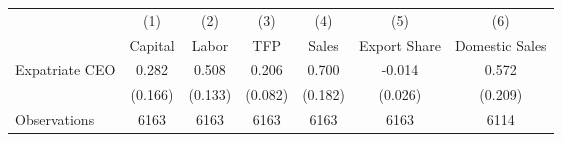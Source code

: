 \begin{tabular}{l*{6}{c}}
\hline\hline
                    &\multicolumn{1}{c}{(1)}&\multicolumn{1}{c}{(2)}&\multicolumn{1}{c}{(3)}&\multicolumn{1}{c}{(4)}&\multicolumn{1}{c}{(5)}&\multicolumn{1}{c}{(6)}\\
                    &\multicolumn{1}{c}{Capital}&\multicolumn{1}{c}{Labor}&\multicolumn{1}{c}{TFP}&\multicolumn{1}{c}{Sales}&\multicolumn{1}{c}{Export Share}&\multicolumn{1}{c}{Domestic Sales}\\
\hline
Expatriate CEO      &       0.282&       0.508&       0.206&       0.700&      -0.014&       0.572\\
                    &     (0.166)&     (0.133)&     (0.082)&     (0.182)&     (0.026)&     (0.209)\\
\hline
Observations        &        6163&        6163&        6163&        6163&        6163&        6114\\
\hline\hline
\end{tabular}
